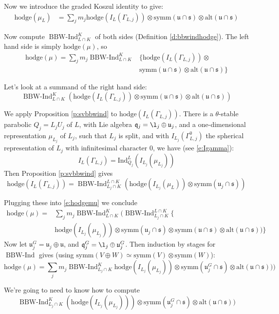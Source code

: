\documentclass[12pt,leqno]{article}
\newcommand{\hodge}{\text{hodge}}
\DeclareMathOperator{\bbwind}{\text{BBW-Ind}}
\newcommand{\Ind}{\text{Ind}}
\newcommand{\symm}{\text{symm}}
\newcommand{\alt}{\text{alt}}
\renewcommand{\q}{\mathfrak q}
\renewcommand{\u}{\mathfrak u}
\newcommand{\ucaps}{\mathfrak u\cap\mathfrak s}
\newcommand{\s}{\mathfrak s}
\begin{document}
Now we introduce the graded Koszul identity to give:
\begin{equation}
\label{e:hodgemuL2}
\begin{aligned}
\hodge(\mu_L)&=
\sum_j m_j\hodge(I_L(\Gamma_{L,j}))
\otimes
\symm(\ucaps)\otimes\alt(\ucaps)
\end{aligned}
\end{equation}

Now compute $\bbwind_{L\cap K}^K$ of both sides (Definition \ref{d:bbwindhodge}).
The left hand side is simply $\hodge(\mu)$, so
\begin{equation}
\label{e:hodgemu}
\begin{aligned}
\hodge(\mu)=
\sum_jm_j\bbwind_{L\cap K}^K&
\big\{\hodge(I_L(\Gamma_{L,j}))\otimes\\
&
\symm(\ucaps)\otimes\alt(\ucaps)\big\}
\end{aligned}
\end{equation}

Let's look at a summand of the right hand side:
$$
\bbwind_{L\cap K}^K(\hodge(I_L(\Gamma_{L,j}))
\otimes\symm(\ucaps)\otimes\alt(\ucaps))
$$

We apply Proposition \ref{p:svbbwind} to $\hodge(I_L(\Gamma_{L,j}))$. There is a
$\theta$-stable parabolic $Q_j=L_jU_j$ of $L$, with Lie algebra $\q_j=\l_j\oplus\u_j$,
and a one-dimensional representation $\mu_{L_j}$ of $L_j$, such that
$L_j$ is split, and
with $I_{L_j}(\Gamma_{L,j}^0)$ the spherical representation of $L_j$ with infinitesimal character $0$, we have
(see \eqref{e:Igamma}):
$$
I_L(\Gamma_{L,j})=\Ind_{Q_j}^{L}(I_{L_j}(\mu_{L_j}))
$$
Then Proposition \ref{p:svbbwind} gives
$$
\hodge(I_L(\Gamma_{L,j}))=
\bbwind_{L_j\cap K}^{L\cap K}(\hodge(I_{L_j}(\mu_L))\otimes\symm(\u_j\cap\s))
$$

Plugging these into \eqref{e:hodgemu} we conclude
$$
\begin{aligned}
\hodge(\mu)=&
\sum_jm_j\bbwind_{L\cap K}^K
(\bbwind_{L_j\cap K}^{L\cap K}\big\{\\
&\hodge(I_{L_j}(\mu_{L_j}))
\otimes
\symm(\u_j\cap \s)\otimes\symm(\ucaps)\otimes\alt(\ucaps))\big\}
\end{aligned}
$$
Now let $\u^G_j=\u_j\oplus \u$, and $\q^G_j=\l_j\oplus\u^G_j$. Then induction by stages for $\bbwind$ gives
(using $\symm(V\oplus W)\simeq \symm(V)\otimes \symm(W)$):
$$
\hodge(\mu)=
\sum_jm_j\bbwind_{L_j\cap K}^K
\hodge(I_{L_j}(\mu_{L_j}))
\otimes\symm(\u^G_j\cap\s)\otimes\alt(\ucaps)))
$$

We're going to need to know how to compute
$$
\bbwind_{L_j\cap K}^K(\hodge(I_{L_j}(\mu_{L_j})))
\otimes\symm(\u^G_j\cap\s)\otimes\alt(\ucaps))
$$
\end{document}
